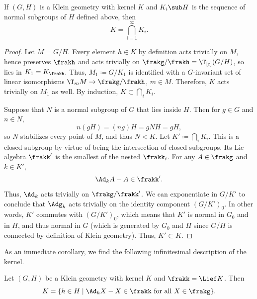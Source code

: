 \begin{lem}
    If $(G,H)$ is a Klein geometry with kernel $K$ and $K_i\sub H$ is the sequence of normal subgroups of $H$ defined above, then 
    \[K=\bigcap_{i=1}^\infty K_i.\]
\end{lem}
\begin{proof}
    Let $M=G\slash H$. Every element $h\in K$ by definition acts trivially on $M$, hence preserves $\frakh$ and acts trivially on $\frakg\slash\frakh=\T_{[e]}(G\slash H)$, so lies in $K_1=K_{\frakh}$. Thus, $M_1\coloneqq G\slash K_1$ is identified with a $G$-invariant set of linear isomorphisms $\T_m M\to \frakg\slash\frakh$, $m\in M$. Therefore, $K$ acts trivially on $M_1$ as well. By induction, $K\subset \bigcap_i K_i$.


    Suppose that $N$ is a normal subgroup of $G$ that lies inside $H$. Then for $g\in G$ and $n\in N$,
    \[n(gH)=(ng)H=gNH=gH,\]
    so $N$ stabilizes every point of $M$, and thus $N<K$. Let $K'\coloneqq \bigcap_i K_i$. This is a closed subgroup by virtue of being the intersection of closed subgroups. Its Lie algebra $\frakk'$ is the smallest of the nested $\frakk_i$. For any $A\in\frakg$ and $k\in K'$, 
    \[\Ad_k A-A\in\frakk'.\]
    Thus, $\Ad_k$ acts trivially on $\frakg\slash\frakk'$. We can exponentiate in $G\slash K'$ to conclude that $\Adg_k$ acts trivially on the identity component $(G\slash K')_0$. In other words, $K'$ commutes with $(G\slash K')_0$, which means that $K'$ is normal in $G_0$ and in $H$, and thus normal in $G$ (which is generated by $G_0$ and $H$ since $G\slash H$ is connected by definition of Klein geometry). Thus, $K'\subset K$.
\end{proof}

As an immediate corollary, we find the following infinitesimal description of the kernel.

\begin{thm}\label{thm 4.1 Sharpe}
    Let $(G,H)$ be a Klein geometry with kernel $K$ and $\frakk=\Lief K$. Then 
    \[K=\{h\in H\mid \Ad_h X-X\in\frakk \text{ for all }X\in\frakg\}.\]
\end{thm}

